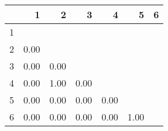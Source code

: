 \begin{tabular}{r|rrrrrr}
  & 1 & 2 & 3 & 4 & 5 & 6 \\ 
  \hline
1 &  &  &  &  &  &  \\ 
  2 & 0.00 &  &  &  &  &  \\ 
  3 & 0.00 & 0.00 &  &  &  &  \\ 
  4 & 0.00 & 1.00 & 0.00 &  &  &  \\ 
  5 & 0.00 & 0.00 & 0.00 & 0.00 &  &  \\ 
  6 & 0.00 & 0.00 & 0.00 & 0.00 & 1.00 &  \\ 
   \hline
\end{tabular}
